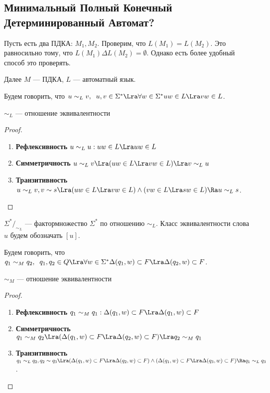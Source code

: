 \subsection{Минимальный Полный Конечный Детерминированный Автомат?}
Пусть есть два ПДКА: \(M_1, M_2\). Проверим, что \(L(M_1) = L(M_2)\). Это равносильно тому, что \(L(M_1) \Delta L(M_2) = \emptyset\). Однако есть более удобный способ это проверять.

Далее \(M\) --- ПДКА, \(L\) --- автоматный язык.

\begin{definition}
    Будем говорить, что \(u \sim_L v,\;\; u, v \in \Sigma^* \Lra \forall w \in \Sigma^* uw \in L \Lra vw \in L\).
\end{definition}
\begin{proposition}
    \(\sim_L\) --- отношение эквивалентности
\end{proposition}
\begin{proof}
    \begin{enumerate}
        \item [] \textbf{Рефлексивность} \(u \sim_L u: uw \in L \Lra uw \in L\)
        \item [] \textbf{Симметричность} \(u \sim_L v \Lra (uw \in L \Lra vw \in L) \Lra v \sim_L u\)
        \item [] \textbf{Транзитивность} \(u \sim_L v, v \sim s \Lra (uw \in L \Lra vw \in L) \wedge (vw \in L \Lra sw \in L) \Ra u \sim_L s\).
    \end{enumerate}
\end{proof}

\begin{note}
    \(\Sigma^*/_{\sim_L}\) --- фактормножество \(\Sigma^*\) по отношению \(\sim_L\). Класс эквивалентности слова \(u\) будем обозначать \([u]\).
\end{note}

\begin{definition}
    Будем говорить, что \(q_1 \sim_M q_2,\;\; q_1, q_2 \in Q \Lra \forall w \in \Sigma^* \Delta(q_1, w) \subset F \Lra \Delta(q_2, w) \subset F\).
\end{definition}
\begin{proposition}
    \(\sim_M\) --- отношение эквивалентности
\end{proposition}
\begin{proof}
    \begin{enumerate}
        \item [] \textbf{Рефлексивность} \(q_1 \sim_M q_1: \Delta(q_1, w) \subset F \Lra \Delta(q_1, w) \subset F\)
        \item [] \textbf{Симметричность} \(q_1 \sim_M q_2 \Lra (\Delta(q_1, w) \subset F \Lra \Delta(q_2, w) \subset F) \Lra q_2 \sim_M q_1\)
        \item [] \textbf{Транзитивность} \(q_1 \sim_L q_2, q_2 \sim q_3 \Lra (\Delta(q_1, w) \subset F \Lra \Delta(q_2, w) \subset F) \wedge (\Delta(q_1, w) \subset F \Lra \Delta(q_3, w) \subset F) \Ra q_1 \sim_L q_3\).
    \end{enumerate}
\end{proof}

